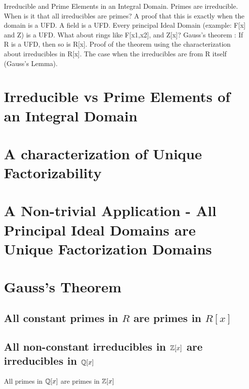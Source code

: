 
\noindent
Irreducible and Prime Elements in an Integral Domain. Primes are irreducible. When is it that all irreducibles are primes? A proof that this is exactly when the domain is a UFD.
A field is a UFD. Every principal Ideal Domain (example: F[x] and Z) is a UFD.
What about rings like F[x1,x2], and Z[x]?
Gauss's theorem : If R is a UFD, then so is R[x].
Proof of the theorem using the characterization about irreducibles in R[x]. The case when the irreducibles are from R itself (Gauss's Lemma).

\section{Irreducible vs Prime Elements of an Integral Domain}

\section{A characterization of Unique Factorizability}

\section{A Non-trivial Application - All Principal Ideal Domains are Unique Factorization Domains}

\section{Gauss's Theorem}
\subsection{All constant primes in $R$ are primes in $R[x]$}
\subsection{All non-constant irreducibles in ${\mathbb{Z}}[x]$ are irreducibles in ${\mathbb{Q}}[x]$}
All primes in ${\mathbb{Q}}[x]$ are primes in ${\mathbb{Z}}[x]$
